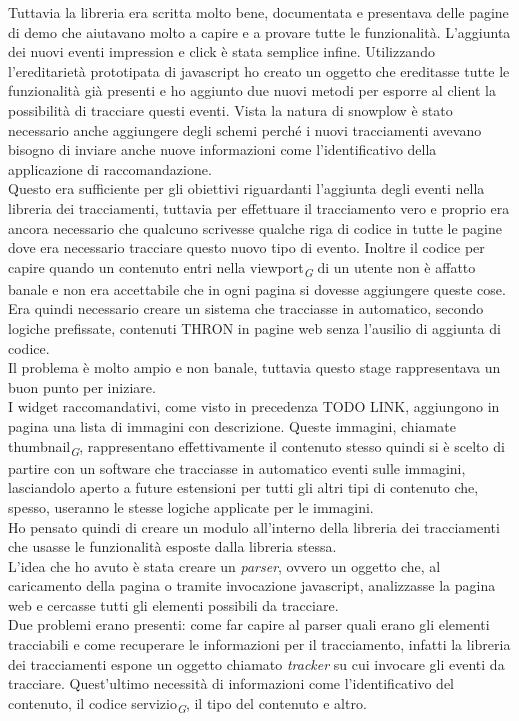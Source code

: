 \documentclass[a4paper, 12pt, twoside, openright]{book}
\newcommand{\gloss}[1]{#1\textsubscript{\textit{\tiny{G}}}}
\begin{document}
Tuttavia la libreria era scritta molto bene, documentata e presentava delle pagine di demo che aiutavano molto a capire e a provare tutte le funzionalità. L'aggiunta dei nuovi eventi impression e click è stata semplice infine. Utilizzando l'ereditarietà prototipata di javascript ho creato un oggetto che ereditasse tutte le funzionalità già presenti e ho aggiunto due nuovi metodi per esporre al client la possibilità di tracciare questi eventi. Vista la natura di snowplow è stato necessario anche aggiungere degli schemi perché i nuovi tracciamenti avevano bisogno di inviare anche nuove informazioni come l'identificativo della applicazione di raccomandazione.\\
Questo era sufficiente per gli obiettivi riguardanti l'aggiunta degli eventi nella libreria dei tracciamenti, tuttavia per effettuare il tracciamento vero e proprio era ancora necessario che qualcuno scrivesse qualche riga di codice in tutte le pagine dove era necessario tracciare questo nuovo tipo di evento. Inoltre il codice per capire quando un contenuto entri nella \gloss{viewport} di un utente non è affatto banale e non era accettabile che in ogni pagina si dovesse aggiungere queste cose.\\
Era quindi necessario creare un sistema che tracciasse in automatico, secondo logiche prefissate, contenuti THRON in pagine web senza l'ausilio di aggiunta di codice.\\
Il problema è molto ampio e non banale, tuttavia questo stage rappresentava un buon punto per iniziare.\\
I widget raccomandativi, come visto in precedenza TODO LINK, aggiungono in pagina una lista di immagini con descrizione. Queste immagini, chiamate \gloss{thumbnail}, rappresentano effettivamente il contenuto stesso quindi si è scelto di partire con un software che tracciasse in automatico eventi sulle immagini, lasciandolo aperto a future estensioni per tutti gli altri tipi di contenuto che, spesso, useranno le stesse logiche applicate per le immagini.\\
Ho pensato quindi di creare un modulo all'interno della libreria dei tracciamenti che usasse le funzionalità esposte dalla libreria stessa.\\
L'idea che ho avuto è stata creare un \textit{parser}, ovvero un oggetto che, al caricamento della pagina o tramite invocazione javascript, analizzasse la pagina web e cercasse tutti gli elementi possibili da tracciare.\\
Due problemi erano presenti: come far capire al parser quali erano gli elementi tracciabili e come recuperare le informazioni per il tracciamento, infatti la libreria dei tracciamenti espone un oggetto chiamato \textit{tracker} su cui invocare gli eventi da tracciare. Quest'ultimo necessità di informazioni come l'identificativo del contenuto, il \gloss{codice servizio}, il tipo del contenuto e altro.\\
\end{document}
